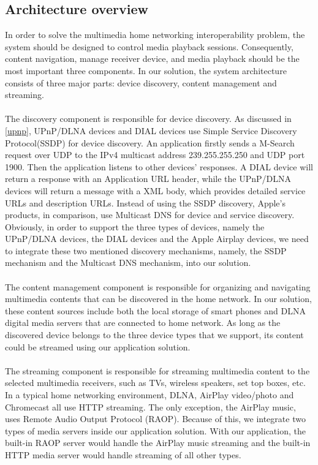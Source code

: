 \subsection{Architecture overview}
In order to solve the multimedia home networking interoperability problem, the system should be designed to control media playback sessions. Consequently, content navigation, manage receiver device, and media playback should be the most important three components. In our solution, the system architecture consists of three major parts: device discovery, content management and streaming.\\
\\
The discovery component is responsible for device discovery. As discussed
in \ref{upnp}, UPnP/DLNA devices and DIAL devices use Simple Service Discovery
Protocol(SSDP) for device discovery. An application firstly sends a M-Search request over UDP to the IPv4 multicast address 239.255.255.250 and UDP port 1900. Then the application listens to other devices' responses. A DIAL device will return a response with an Application URL header, while the UPnP/DLNA devices will return a message with a XML body, which provides detailed service URLs and description URLs. Instead of using the SSDP discovery, Apple's products, in comparison, use Multicast DNS for device and service discovery. Obviously, in order to support the three types of devices, namely the UPnP/DLNA devices, the DIAL devices and the Apple Airplay devices, we need to integrate these two mentioned discovery mechanisms, namely, the SSDP mechanism and the Multicast DNS mechanism, into our solution.\\
\\
The content management component is responsible for organizing and
 navigating multimedia contents that can be discovered in the home network. In our solution, these content sources include both the local storage of smart phones and DLNA digital media servers that are connected to home network. As long as the discovered device belongs to the three device types that we support, its content could be streamed using our application solution.\\
\\
The streaming component is responsible for streaming multimedia content to the selected multimedia receivers, such as TVs, wireless speakers, set top boxes, etc. In a typical home networking environment, DLNA, AirPlay video/photo and Chromecast all use HTTP streaming. The only exception, the AirPlay music, uses Remote Audio Output Protocol (RAOP). Because of this, we integrate two types of media servers inside our application solution. With our application, the built-in RAOP server would handle the AirPlay music streaming and the built-in HTTP media server would handle streaming of all other types.

